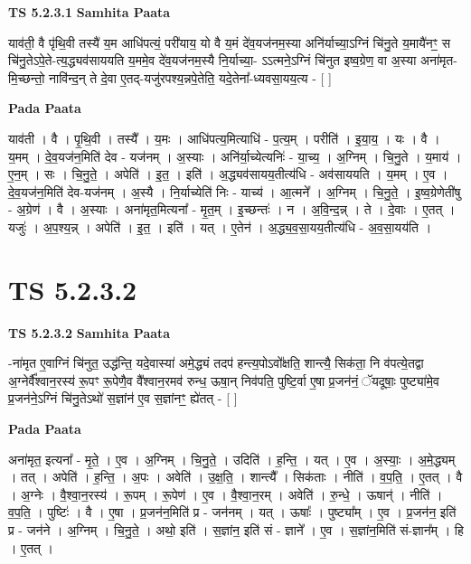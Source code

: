 \documentclass[17pt]{extarticle}
\begin{document}
\textbf{TS 5.2.3.1 } \newline
\textbf{Samhita Paata} \newline

याव॑ती॒ वै पृ॑थि॒वी तस्यै॑ य॒म आधि॑पत्यं॒ परी॑याय॒ यो वै य॒मं दे॑व॒यज॑नम॒स्या अनि॑र्याच्या॒ऽग्निं चि॑नु॒ते य॒मायै॑नꣳ॒॒ स चि॑नु॒तेऽपे॒ते-त्य॒द्ध्यव॑साययति य॒ममे॒व दे॑व॒यज॑नम॒स्यै नि॒र्याच्या॒- ऽऽत्मने॒ऽग्निं चि॑नुत इष्व॒ग्रेण॒ वा अ॒स्या अना॑मृत-मि॒च्छन्तो॒ नावि॑न्द॒न् ते दे॒वा ए॒तद्-यजु॑रपश्य॒न्नपे॒तेति॒ यदे॒तेना᳚-ध्यवसा॒यय॒त्य - [  ] \newline

\textbf{Pada Paata} \newline

याव॑ती । वै । पृ॒थि॒वी । तस्यै᳚ । य॒मः । आधि॑पत्य॒मित्याधि॑ - प॒त्य॒म् । परीति॑ । इ॒या॒य॒ । यः । वै । य॒मम् । दे॒व॒यज॑न॒मिति॑ देव - यज॑नम् । अ॒स्याः । अनि॑र्या॒च्येत्यनिः॑ - या॒च्य॒ । अ॒ग्निम् । चि॒नु॒ते । य॒माय॑ । ए॒न॒म् । सः । चि॒नु॒ते॒ । अपेति॑ । इ॒त॒ । इति॑ । अ॒द्ध्यव॑सायय॒तीत्य॑धि - अव॑साययति । य॒मम् । ए॒व । दे॒व॒यज॑न॒मिति॑ देव-यज॑नम् । अ॒स्यै । नि॒र्याच्येति॑ निः - याच्य॑ । आ॒त्मने᳚ । अ॒ग्निम् । चि॒नु॒ते॒ । इ॒ष्व॒ग्रेणेती॑षु - अ॒ग्रेण॑ । वै । अ॒स्याः । अना॑मृत॒मित्यना᳚ - मृ॒त॒म् । इ॒च्छन्तः॑ । न । अ॒वि॒न्द॒न्न् । ते । दे॒वाः । ए॒तत् । यजुः॑ । अ॒प॒श्य॒न्न् । अपेति॑ । इ॒त॒ । इति॑ । यत् । ए॒तेन॑ । अ॒द्ध्य॒व॒सा॒यय॒तीत्य॑धि - अ॒व॒सा॒यय॑ति ।  \newline





\section{ TS 5.2.3.2 }

\textbf{TS 5.2.3.2 } \newline
\textbf{Samhita Paata} \newline

-ना॑मृत ए॒वाग्निं चि॑नुत॒ उद्ध॑न्ति॒ यदे॒वास्या॑ अमे॒द्ध्यं तदप॑ हन्त्य॒पोऽवो᳚क्षति॒ शान्त्यै॒ सिक॑ता॒ नि व॑पत्ये॒तद्वा अ॒ग्नेर्वै᳚श्वान॒रस्य॑ रू॒पꣳ रू॒पेणै॒व वै᳚श्वान॒रमव॑ रुन्ध॒ ऊषा॒न् निव॑पति॒ पुष्टि॒र्वा ए॒षा प्र॒जन॑नं॒ ॅयदूषाः॒ पुष्ट्या॑मे॒व प्र॒जन॑ने॒ऽग्निं चि॑नु॒तेऽथो॑ स॒ज्ञांन॑ ए॒व स॒ज्ञांनꣳ॒॒ ह्ये॑तत् - [  ] \newline

\textbf{Pada Paata} \newline

अना॑मृत॒ इत्यना᳚ - मृ॒ते॒ । ए॒व । अ॒ग्निम् । चि॒नु॒ते॒ । उदिति॑ । ह॒न्ति॒ । यत् । ए॒व । अ॒स्याः॒ । अ॒मे॒द्ध्यम् । तत् । अपेति॑ । ह॒न्ति॒ । अ॒पः । अवेति॑ । उ॒क्ष॒ति॒ । शान्त्यै᳚ । सिक॑ताः । नीति॑ । व॒प॒ति॒ । ए॒तत् । वै । अ॒ग्नेः । वै॒श्वा॒न॒रस्य॑ । रू॒पम् । रू॒पेण॑ । ए॒व । वै॒श्वा॒न॒रम् । अवेति॑ । रु॒न्धे॒ । ऊषान्॑ । नीति॑ । व॒प॒ति॒ । पुष्टिः॑ । वै । ए॒षा । प्र॒जन॑न॒मिति॑ प्र - जन॑नम् । यत् । ऊषाः᳚ । पुष्ट्या᳚म् । ए॒व । प्र॒जन॑न॒ इति॑ प्र - जन॑ने । अ॒ग्निम् । चि॒नु॒ते॒ । अथो॒ इति॑ । स॒ज्ञांन॒ इति॑ सं - ज्ञाने᳚ । ए॒व । स॒ज्ञांन॒मिति॑ सं-ज्ञान᳚म् । हि । ए॒तत् ।  \newline
\end{document}
